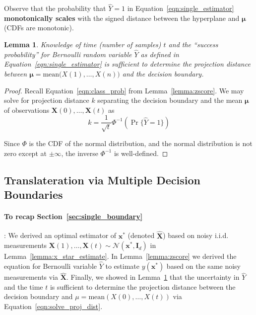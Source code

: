 \documentclass[12pt]{article}
\newtheorem{lemma}{Lemma}
\begin{document}
Observe that the probability that $\hat Y = 1$ in Equation~\ref{eqn:single_estimator} \textbf{monotonically scales} with the signed distance between the hyperplane and $\mathbf \mu$ (CDFs are monotonic). 

\begin{lemma}
	\label{lemma:prob_to_dist}
	Knowledge of time (number of samples) $t$ and the ``success probability'' for Bernoulli random variable $\hat Y$ as defined in Equation~\ref{eqn:single_estimator} is sufficient to determine the projection distance between $\mathbf \mu = \text{mean}\big(X(1), \dots, X(n)\big)$ and the decision boundary. 
\end{lemma}
\begin{proof}
	Recall Equation~\ref{eqn:class_prob} from Lemma~\ref{lemma:zscore}. 
	We may solve for projection distance $k$ separating the decision boundary and the mean $\mathbf \mu$ of observations $\mathbf X(0), \dots, \mathbf X(t)$ as 
	\begin{equation}
		\label{eqn:solve_proj_dist}
		k = \frac{1}{\sqrt t}\Phi^{-1}(\Pr\{\hat Y = 1\})
	\end{equation}

	Since $\Phi$ is the CDF of the normal distribution, and the normal distribution is not zero except at $\pm \infty$, the inverse $\Phi^{-1}$ is well-defined.
\end{proof}


\subsection{Translateration via Multiple Decision Boundaries}

\paragraph{To recap Section~\ref{sec:single_boundary}}: 
We derived an optimal estimator of $\mathbf x^*$ (denoted $\hat{\mathbf X}$) based on noisy i.i.d. measurements $\mathbf X(1), \dots, \mathbf X(t) \sim \mathcal N(\mathbf x^*, \mathbf I_d)$ in Lemma~\ref{lemma:x_star_estimate}. 
In Lemma~\ref{lemma:zscore} we derived the equation for Bernoulli variable $\hat Y$ to estimate $y(\mathbf x^*)$ based on the same noisy measurements via $\hat{\mathbf X}$.
Finally, we showed in Lemma~\ref{lemma:prob_to_dist} that the uncertainty in $\hat Y$ and the time $t$ is sufficient to determine the projection distance between the decision boundary and $\mu = \text{mean}(X(0), \dots, X(t))$ via Equation~\ref{eqn:solve_proj_dist}. \\
\end{document}
